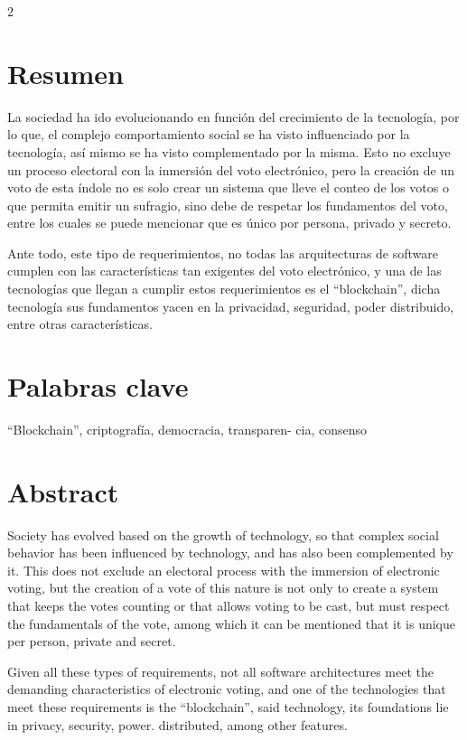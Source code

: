\documentclass[12pt,spanish,Letterpaper,openany]{book}
\begin{document}
\begin {multicols}{2}

\hypertarget{resumen}{%
\section{Resumen}\label{resumen}}

La sociedad ha ido evolucionando en función del crecimiento de la tecnología, por lo que, el complejo comportamiento social se ha visto influenciado por la tecnología, así mismo se ha visto complementado por la misma. Esto no excluye un proceso electoral con la inmersión del voto electrónico, pero la creación de un voto de esta índole no es solo crear un sistema que lleve el conteo de los votos o que permita emitir un sufragio, sino debe de respetar los fundamentos del voto, entre los cuales se puede mencionar que es único por persona, privado y secreto.

Ante todo, este tipo de requerimientos, no todas las arquitecturas de software cumplen con las características tan exigentes del voto electrónico, y una de las tecnologías que llegan a cumplir estos requerimientos es el ``blockchain'', dicha tecnología sus fundamentos yacen en la privacidad, seguridad, poder distribuido, entre otras características.

\hypertarget{palabras-clave}{%
\section{Palabras clave}\label{palabras-clave}}

``Blockchain'', criptografía, democracia, transparen-
cia, consenso

\hypertarget{abstract}{%
\section{Abstract}\label{abstract}}

Society has evolved based on the growth of technology, so that complex social behavior has been influenced by technology, and has also been complemented by it. This does not exclude an electoral process with the immersion of electronic voting, but the creation of a vote of this nature is not only to create a system that keeps the votes counting or that allows voting to be cast, but must respect the fundamentals of the vote, among which it can be mentioned that it is unique per person, private and secret.

Given all these types of requirements, not all software architectures meet the demanding characteristics of electronic voting, and one of the technologies that meet these requirements is the ``blockchain'', said technology, its foundations lie in privacy, security, power. distributed, among other features.


\end{multicols}
\end{document}
